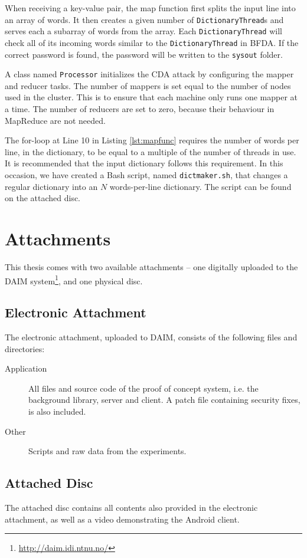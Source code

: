 \documentclass[pdftex,english,10pt,b5paper,twoside]{book}
\begin{document}


When receiving a key-value pair, the map function first splits the input line
into an array of words. It then creates a given number of
\texttt{DictionaryThread}s and serves each a subarray of words from the
array. Each \texttt{DictionaryThread} will check all of its incoming words
similar to the \texttt{DictionaryThread} in \ac{BFDA}. If the correct password is
found, the password will be written to the \texttt{sysout} folder.

A class named \texttt{Processor} initializes the \ac{CDA} attack by configuring
the mapper and reducer tasks. The number of mappers is set equal to the number
of nodes used in the cluster. This is to ensure that each machine only runs one
mapper at a time. The number of reducers are set to zero, because their
behaviour in MapReduce are not needed.

The for-loop at Line 10 in Listing \ref{lst:mapfunc} requires the number of
words per line, in the dictionary, to be equal to a multiple of the number of
threads in use. It is recommended that the input dictionary follows this
requirement. In this occasion, we have created a Bash script, named
\texttt{dictmaker.sh}, that changes a regular dictionary into an $N$
words-per-line dictionary. The script can be found on the attached disc.

\chapter{Attachments}
\label{ap:attachments}

This thesis comes with two available attachments -- one digitally uploaded to
the DAIM system\footnote{\url{http://daim.idi.ntnu.no/}}, and one physical disc.

\section{Electronic Attachment}

The electronic attachment, uploaded to
DAIM, consists of the following files
and directories:

\begin{description}
  \item[Application] All files and source code of the proof of concept system,
    i.e. the background library, server and client. A patch file containing
    security fixes, is also included.
  \item[Other] Scripts and raw data from the experiments.
\end{description}

\section{Attached Disc}
The attached disc contains all contents also provided in the electronic
attachment, as well as a video demonstrating the Android client.
\end{document}
